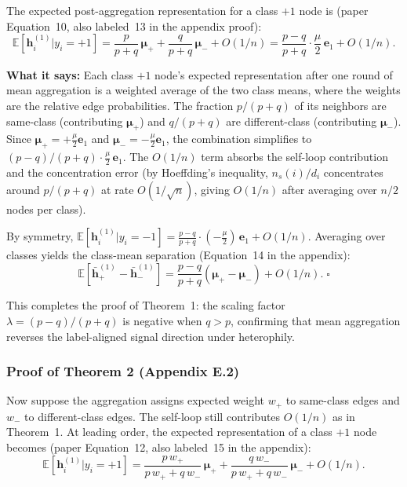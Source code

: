 \documentclass[11pt,a4paper]{article}
\newcommand{\E}{\mathbb{E}}
\newcommand{\bh}{\mathbf{h}}
\theoremstyle{definition}
\theoremstyle{plain}
\begin{document}
The expected post-aggregation representation for a class $+1$ node is
(paper Equation~10, also labeled~13 in the appendix proof):
\begin{equation}
  \E[\bh_i^{(1)} | y_i = +1]
  = \frac{p}{p+q}\,\boldsymbol{\mu}_+
  + \frac{q}{p+q}\,\boldsymbol{\mu}_-
  + O(1/n)
  = \frac{p - q}{p + q} \cdot \frac{\mu}{2}\,\mathbf{e}_1 + O(1/n).
  \tag{Eq.~10}
\end{equation}

\textbf{What it says:}
Each class $+1$ node's expected representation after one round of mean aggregation
is a weighted average of the two class means, where the weights are the
relative edge probabilities.
The fraction $p/(p+q)$ of its neighbors are same-class (contributing
$\boldsymbol{\mu}_+$) and $q/(p+q)$ are different-class (contributing
$\boldsymbol{\mu}_-$).
Since $\boldsymbol{\mu}_+ = +\frac{\mu}{2}\mathbf{e}_1$ and
$\boldsymbol{\mu}_- = -\frac{\mu}{2}\mathbf{e}_1$, the combination
simplifies to $(p-q)/(p+q) \cdot \frac{\mu}{2}\,\mathbf{e}_1$.
The $O(1/n)$ term absorbs the self-loop contribution and the concentration
error (by Hoeffding's inequality, $n_s(i)/d_i$ concentrates around $p/(p+q)$
at rate $O(1/\sqrt{n})$, giving $O(1/n)$ after averaging over $n/2$ nodes per class).

By symmetry, $\E[\bh_i^{(1)} | y_i = -1] = \frac{p-q}{p+q} \cdot (-\frac{\mu}{2})\,\mathbf{e}_1 + O(1/n)$.
Averaging over classes yields the class-mean separation (Equation~14 in the appendix):
\begin{equation}
  \E[\bar{\bh}_+^{(1)} - \bar{\bh}_-^{(1)}]
  = \frac{p - q}{p + q}(\boldsymbol{\mu}_+ - \boldsymbol{\mu}_-) + O(1/n).\;\square
  \tag{Eq.~14}
\end{equation}

This completes the proof of Theorem~1: the scaling factor $\lambda = (p-q)/(p+q)$
is negative when $q > p$, confirming that mean aggregation reverses the
label-aligned signal direction under heterophily.


\subsubsection{Proof of Theorem 2 (Appendix E.2)}

Now suppose the aggregation assigns expected weight $w_+$ to same-class edges
and $w_-$ to different-class edges.
The self-loop still contributes $O(1/n)$ as in Theorem~1.
At leading order, the expected representation of a class $+1$ node becomes
(paper Equation~12, also labeled~15 in the appendix):
\begin{equation}
  \E[\bh_i^{(1)} | y_i = +1]
  = \frac{p\, w_+}{p\, w_+ + q\, w_-}\,\boldsymbol{\mu}_+
  + \frac{q\, w_-}{p\, w_+ + q\, w_-}\,\boldsymbol{\mu}_-
  + O(1/n).
  \tag{Eq.~12}
\end{equation}
\end{document}
